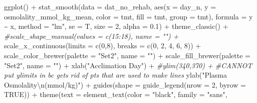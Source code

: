 \documentclass[
]{article}
\newenvironment{Shaded}{\begin{snugshade}}{\end{snugshade}}
\newcommand{\AttributeTok}[1]{\textcolor[rgb]{0.77,0.63,0.00}{#1}}
\newcommand{\CommentTok}[1]{\textcolor[rgb]{0.56,0.35,0.01}{\textit{#1}}}
\newcommand{\ConstantTok}[1]{\textcolor[rgb]{0.00,0.00,0.00}{#1}}
\newcommand{\DecValTok}[1]{\textcolor[rgb]{0.00,0.00,0.81}{#1}}
\newcommand{\FloatTok}[1]{\textcolor[rgb]{0.00,0.00,0.81}{#1}}
\newcommand{\FunctionTok}[1]{\textcolor[rgb]{0.00,0.00,0.00}{#1}}
\newcommand{\NormalTok}[1]{#1}
\newcommand{\SpecialCharTok}[1]{\textcolor[rgb]{0.00,0.00,0.00}{#1}}
\newcommand{\StringTok}[1]{\textcolor[rgb]{0.31,0.60,0.02}{#1}}
\begin{document}
\begin{Shaded}
\begin{Highlighting}[]
\FunctionTok{ggplot}\NormalTok{() }\SpecialCharTok{+} 
  \FunctionTok{stat\_smooth}\NormalTok{(}\AttributeTok{data =}\NormalTok{ dat\_no\_rehab,}
              \FunctionTok{aes}\NormalTok{(}\AttributeTok{x =}\NormalTok{ day\_n,}
                  \AttributeTok{y =}\NormalTok{ osmolality\_mmol\_kg\_mean, }
                  \AttributeTok{color =}\NormalTok{ tmt,}
                  \AttributeTok{fill =}\NormalTok{ tmt,}
                  \AttributeTok{group =}\NormalTok{ tmt),}
              \AttributeTok{formula =}\NormalTok{ y }\SpecialCharTok{\textasciitilde{}}\NormalTok{ x, }
              \AttributeTok{method =} \StringTok{"lm"}\NormalTok{, }
              \AttributeTok{se =}\NormalTok{ T, }
              \AttributeTok{size =} \DecValTok{2}\NormalTok{, }
              \AttributeTok{alpha =} \FloatTok{0.1}\NormalTok{) }\SpecialCharTok{+} 
  \FunctionTok{theme\_classic}\NormalTok{() }\SpecialCharTok{+} 
  \CommentTok{\#scale\_shape\_manual(values = c(15:18), name = "") +}
  \FunctionTok{scale\_x\_continuous}\NormalTok{(}\AttributeTok{limits =} \FunctionTok{c}\NormalTok{(}\DecValTok{0}\NormalTok{,}\DecValTok{8}\NormalTok{), }
                     \AttributeTok{breaks =} \FunctionTok{c}\NormalTok{(}\DecValTok{0}\NormalTok{, }\DecValTok{2}\NormalTok{, }\DecValTok{4}\NormalTok{, }\DecValTok{6}\NormalTok{, }\DecValTok{8}\NormalTok{)) }\SpecialCharTok{+}
  \FunctionTok{scale\_color\_brewer}\NormalTok{(}\AttributeTok{palette =} \StringTok{"Set2"}\NormalTok{, }\AttributeTok{name =} \StringTok{""}\NormalTok{) }\SpecialCharTok{+}
  \FunctionTok{scale\_fill\_brewer}\NormalTok{(}\AttributeTok{palette =} \StringTok{"Set2"}\NormalTok{, }\AttributeTok{name =} \StringTok{""}\NormalTok{) }\SpecialCharTok{+}
  \FunctionTok{xlab}\NormalTok{(}\StringTok{"Acclimation Day"}\NormalTok{) }\SpecialCharTok{+} 
  \CommentTok{\#ylim(340,370) + \#CANNOT put ylimits in bc gets rid of pts that are used to make lines}
  \FunctionTok{ylab}\NormalTok{(}\StringTok{"Plasma Osmolality}\SpecialCharTok{\textbackslash{}n}\StringTok{(mmol/kg)"}\NormalTok{) }\SpecialCharTok{+} 
  \FunctionTok{guides}\NormalTok{(}\AttributeTok{shape =} \FunctionTok{guide\_legend}\NormalTok{(}\AttributeTok{nrow =} \DecValTok{2}\NormalTok{, }\AttributeTok{byrow =} \ConstantTok{TRUE}\NormalTok{)) }\SpecialCharTok{+}
  \FunctionTok{theme}\NormalTok{(}\AttributeTok{text =} \FunctionTok{element\_text}\NormalTok{(}\AttributeTok{color =} \StringTok{"black"}\NormalTok{, }
                            \AttributeTok{family =} \StringTok{"sans"}\NormalTok{, }

\end{Highlighting}
\end{Shaded}
\end{document}
